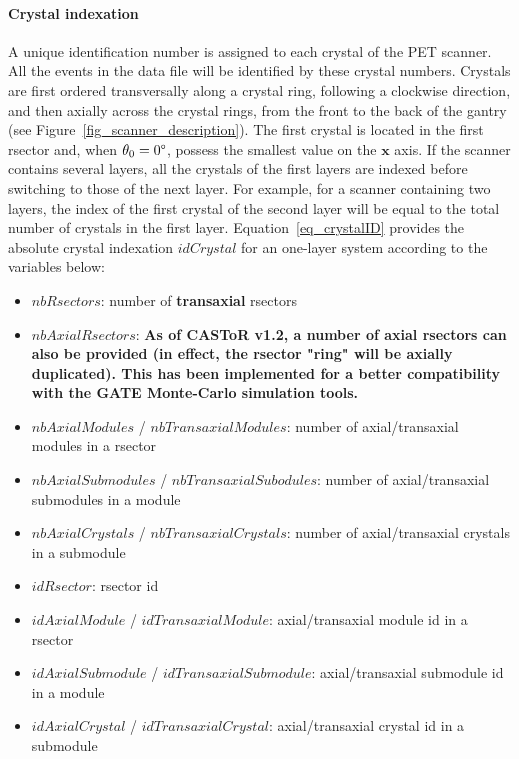 \documentclass[a4paper, 11pt]{article}
\begin{document}
\paragraph{Crystal indexation} 
A unique identification number is assigned to each crystal of the PET scanner. 
All the events in the data file will be identified by these crystal numbers.
Crystals are first ordered transversally along a crystal ring, following a clockwise direction, and then axially across the crystal rings, from the front to
the back of the gantry (see Figure~\ref{fig_scanner_description}). 
The first crystal is located in the first rsector and, when  $\theta_0=0\degree$, possess the smallest value on the $\mathbf x$ axis.
If the scanner contains several layers, all the crystals of the first layers are indexed before switching to those of the next layer. 
For example, for a scanner containing two layers, the index of the first crystal of the second layer will be equal to the total number of crystals in the first layer.
Equation~\ref{eq_crystalID} provides the absolute crystal indexation $idCrystal$ for an one-layer system according to the variables below:

\begin{itemize}
  \item $nbRsectors$: number of \textbf{transaxial} rsectors
  \item $nbAxialRsectors$: \textbf{As of CASToR v1.2, a number of axial rsectors can also be provided (in effect, the rsector "ring" will be axially duplicated). This has been implemented for a better compatibility with the GATE Monte-Carlo simulation tools.}
  \item $nbAxialModules$ / $nbTransaxialModules$: number of axial/transaxial modules in a rsector
  \item $nbAxialSubmodules$ / $nbTransaxialSubodules$: number of axial/transaxial submodules in a module
  \item $nbAxialCrystals$ / $nbTransaxialCrystals$: number of axial/transaxial crystals in a submodule
  \item $idRsector$: rsector id
  \item $idAxialModule$ / $idTransaxialModule$: axial/transaxial module id in a rsector
  \item $idAxialSubmodule$ / $idTransaxialSubmodule$: axial/transaxial submodule id in a module
  \item $idAxialCrystal$ / $idTransaxialCrystal$: axial/transaxial crystal id in a submodule
\end{itemize}
\end{document}
